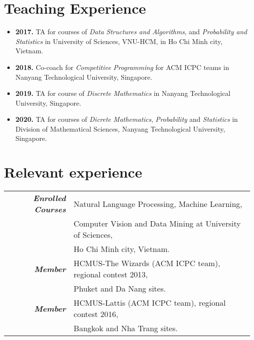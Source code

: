 \documentclass[a4paper, 11pt]{article}
\begin{document}
	\section{Teaching Experience}
	\begin{itemize}
		\item \textbf{2017.} TA for courses of \textit{Data Structures and Algorithms}, and \textit{Probability and Statistics} in University of Sciences, VNU-HCM, in Ho Chi Minh city, Vietnam.
		\item \textbf{2018.} Co-coach for \textit{Competitive Programming} for ACM ICPC teams in Nanyang Technological University, Singapore.
		\item \textbf{2019.} TA for course of \textit{Discrete Mathematics} in Nanyang Technological University, Singapore.
		\item \textbf{2020.} TA for courses of \textit{Dicrete Mathematics}, \textit{Probability} and \textit{Statistics} in Division of Mathematical Sciences, Nanyang Technological University, Singapore.
	\end{itemize}
	
	\section{Relevant experience}
	\begin{tabular}{rl}
		{\sl \textbf{Enrolled Courses}} & Natural Language Processing, Machine Learning,\\ &Computer Vision and Data Mining at University of Sciences,\\ &Ho Chi Minh city, Vietnam.\\
		{\sl \textbf{Member}} & HCMUS-The Wizards (ACM ICPC team), regional contest 2013,\\
		& Phuket and Da Nang sites.\\
		{\sl \textbf{Member}} & HCMUS-Lattis (ACM ICPC team), regional contest 2016,\\
		& Bangkok and Nha Trang sites. 
	\end{tabular}
	
	
	
\end{document}
